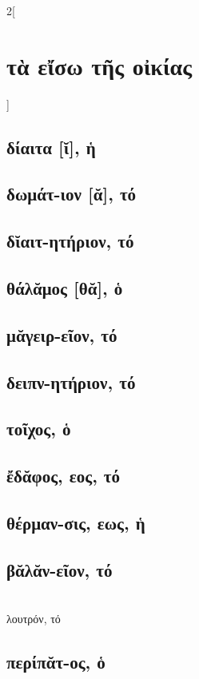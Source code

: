 \documentclass{book}
\begin{document}
\begin{multicols}{2}[\section{τὰ εἴσω τῆς οἰκίας}]
\subsection{δίαιτα [ῐ], ἡ}
\subsection{δωμάτ-ιον [ᾰ], τό}
\subsection{δῐαιτ-ητήριον, τό}
\subsection{θάλᾰμος [θᾰ], ὁ}
\subsection{μᾰγειρ-εῖον, τό}
\subsection{δειπν-ητήριον, τό}
\subsection{τοῖχος, ὁ}
\subsection{ἔδᾰφος, εος, τό}
\subsection{θέρμαν-σις, εως, ἡ}
\subsection{βᾰλᾰν-εῖον, τό}
 ~\\
λουτρόν, τό
\subsection{περίπᾰτ-ος, ὁ}

\end{multicols}
\end{document}
